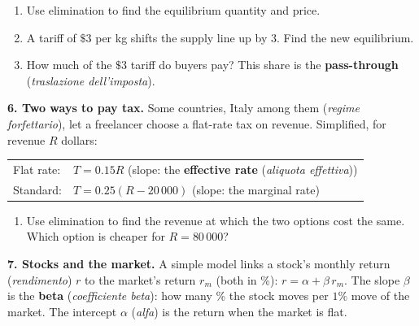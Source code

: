 \documentclass[12pt, twoside]{article}
\newcommand{\ita}[1]{(\emph{#1})}
\begin{document}
\begin{enumerate}[label=(\alph*), itemsep=0.1cm]
  \item Use elimination to find the equilibrium quantity and price.
  \vspace{1.2cm}
  \item A tariff of $\$3$ per kg shifts the supply line up by $3$. Find the
  new equilibrium.
  \vspace{1.2cm}
  \item How much of the $\$3$ tariff do buyers pay? This share is the
  \textbf{pass-through} \ita{traslazione dell'imposta}.
  \vspace{0.8cm}
\end{enumerate}

\newpage

\textbf{6. Two ways to pay tax.} Some countries, Italy among them
\ita{regime forfettario}, let a freelancer choose a flat-rate tax on
revenue. Simplified, for revenue $R$ dollars:

\smallskip
\begin{tabular}{@{}ll@{}}
  Flat rate: & $T = 0.15R$ \quad (slope: the \textbf{effective rate} \ita{aliquota effettiva}) \\
  Standard: & $T = 0.25(R - 20\,000)$ \quad (slope: the marginal rate)
\end{tabular}

\begin{enumerate}[label=(\alph*), itemsep=0.1cm]
  \item Use elimination to find the revenue at which the two options cost
  the same. Which option is cheaper for $R = 80\,000$?
  \vspace{1.6cm}
\end{enumerate}

\textbf{7. Stocks and the market.} A simple model links a stock's monthly
return \ita{rendimento} $r$ to the market's return $r_m$ (both in \%):
$r = \alpha + \beta\, r_m$. The slope $\beta$ is the \textbf{beta}
\ita{coefficiente beta}: how many \% the stock moves per $1\%$ move of the
market. The intercept $\alpha$ \ita{alfa} is the return when the market is
flat.
\end{document}
